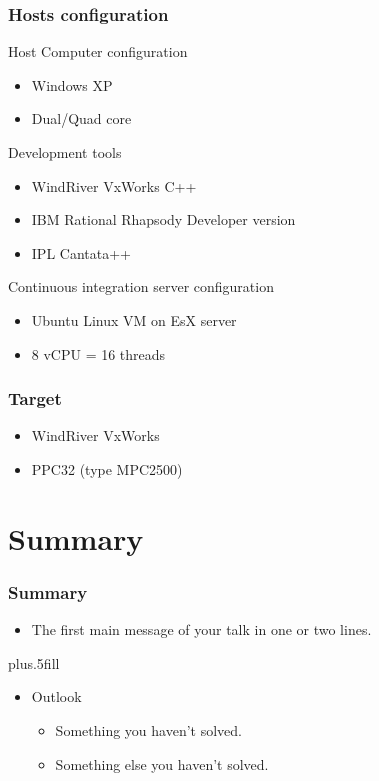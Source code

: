 \documentclass{beamer}
\begin{document}
\begin{frame}
\frametitle{Hosts configuration}
Host Computer configuration
\begin{itemize}
  \item Windows XP
  \item Dual/Quad core
\end{itemize}

Development tools
\begin{itemize}
  \item WindRiver VxWorks C++
  \item IBM Rational Rhapsody Developer version
  \item IPL Cantata++
\end{itemize}

Continuous integration server configuration
\begin{itemize}
  \item Ubuntu Linux VM on EsX server
  \item 8 vCPU = 16 threads
\end{itemize}

\end{frame}

\begin{frame}
\frametitle{Target}

\begin{itemize}
  \item WindRiver VxWorks
  \item PPC32 (type MPC2500)
\end{itemize}

\end{frame}




\section*{Summary}

\begin{frame}
\frametitle<presentation>{Summary}

\begin{itemize}
  \item The \alert{first main message} of your talk in one or two lines.
\end{itemize}

\vskip0pt plus.5fill
\begin{itemize}
  \item Outlook
  \begin{itemize}
    \item Something you haven't solved.
    \item Something else you haven't solved.
  \end{itemize}
\end{itemize}
\end{frame}
\end{document}
